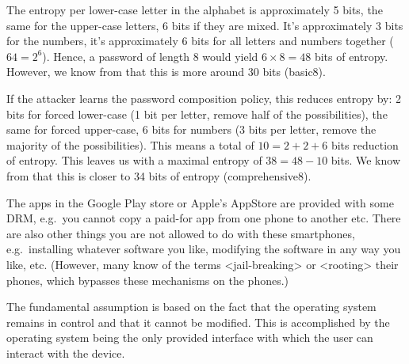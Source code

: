 \documentclass[svv,addpoints]{miunexam}
\begin{document}
\begin{questions}
\begin{solution}
    The entropy per lower-case letter in the alphabet is approximately 5 bits, 
    the same for the upper-case letters, 6 bits if they are mixed.
    It's approximately 3 bits for the numbers, it's approximately 6 bits for 
    all letters and numbers together (\(64 = 2^6\)).
    Hence, a password of length 8 would yield \(6\times 8 = 48\) bits of 
    entropy.
    However, we know from \cite{Komanduri2011opa} that this is more around 30 
    bits (basic8).

    If the attacker learns the password composition policy, this reduces 
    entropy by:
    2 bits for forced lower-case (1 bit per letter, remove half of the 
    possibilities),
    the same for forced upper-case,
    6 bits for numbers (3 bits per letter, remove the majority of the 
    possibilities).
    This means a total of \(10 = 2+2+6\) bits reduction of entropy.
    This leaves us with a maximal entropy of \(38 = 48 - 10\) bits.
    We know from \cite{Komanduri2011opa} that this is closer to 34 bits of 
    entropy (comprehensive8).
  \end{solution}


  \question\label{q:drm:trustcomp:A}
  The apps in the Google Play store or Apple's AppStore are provided with some 
  DRM, e.g.~you cannot copy a paid-for app from one phone to another etc.
  There are also other things you are not allowed to do with these smartphones, 
  e.g.~installing whatever software you like, modifying the software in any way 
  you like, etc.
  (However, many know of the terms <jail-breaking> or <rooting> their phones, 
  which bypasses these mechanisms on the phones.)

  
  \begin{solution}
    The fundamental assumption is based on the fact that the operating system 
    remains in control and that it cannot be modified.
    This is accomplished by the operating system being the only provided 
    interface with which the user can interact with the device.


\end{solution}
\end{questions}
\end{document}
